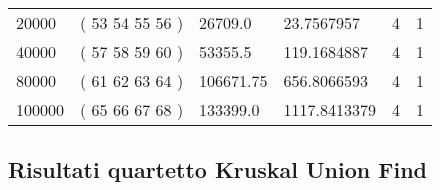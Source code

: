 \begin{longtable}{llllll}
    20000          & ( 53 54 55 56 )   & 26709.0                & 23.7567957       & 4                         & 1                                 \\
    40000          & ( 57 58 59 60 )   & 53355.5                & 119.1684887      & 4                         & 1                                 \\
    80000          & ( 61 62 63 64 )   & 106671.75              & 656.8066593      & 4                         & 1                                 \\
    100000         & ( 65 66 67 68 )   & 133399.0               & 1117.8413379     & 4                         & 1                                
    \end{longtable}

\subsection{Risultati quartetto Kruskal Union Find}

